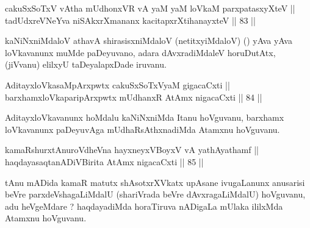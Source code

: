 
\begin{shl}
cakuSxSoTxV vA\s tha mUdhonxVR vA yaM yaM loVkaM parxpatasxyXteV || \\
tadUdxreVNeYva niSAkxrXmananx kacitapxrXtihanayxteV \hfill || 83 ||  
\end{shl}

\begin{artha}
kaNiNxniMdaloV athavA shirasisxniMdaloV (netitxyiMdaloV) (\quad) yAva
yAva loVkavanunx muMde paDeyuvano, adara dAvxradiMdaleV horuDutAtx,
(jiVvanu) elilxyU taDeyalapxDade iruvanu.
\end{artha}

\begin{shl}
AditayxloVka\footnotemark[1]saMpArxpwtx cakuSxSoTxV\s yaM gigacaCxti || \\
barxhamxloVka\footnotemark[2]paripArxpwtx mUdhanxR AtAmx nigacaCxti \hfill || 84 ||  
\end{shl}

\begin{artha}
AditayxloVkavanunx hoMdalu kaNiNxniMda Itanu
hoVguvanu, barxhamx loVkavanunx paDeyuvAga mUdhaRsAthxnadiMda Atamxnu
hoVguvanu.
\end{artha}


	
\begin{shl}
kamaRshurxtAnuroVdheVna hayxneyxVBoyxV vA yathAyathamf || \\
haqdayasaqtanADiVBirita AtAmx nigacaCxti \hfill || 85 ||   
\end{shl}

\begin{artha}
tAnu mADida kamaR matutx shAsotxrXVkatx upAsane ivugaLanunx anusarisi
beVre parxdeVshagaLiMdalU (shariVrada beVre dAvxragaLiMdalU)
hoVguvanu, adu heVgeMdare ? haqdayadiMda horaTiruva nADigaLa mUlaka
ililxMda Atamxnu hoVguvanu.
\end{artha}


